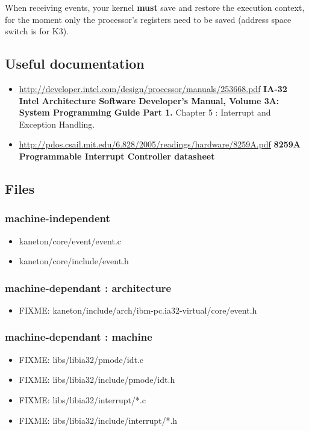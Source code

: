 When receiving events, your kernel \textbf{must} save and restore
the execution context, for the moment only the processor's
registers need to be saved (address space switch is for K3).

\subsection*{Useful documentation}

\begin{itemize}
  \item \url{http://developer.intel.com/design/processor/manuals/253668.pdf}
	    {\textbf{IA-32 Intel Architecture Software Developer's Manual,
	    Volume 3A: System Programming Guide Part 1.}}
	    Chapter 5 : Interrupt and Exception Handling.
  \item \url{http://pdos.csail.mit.edu/6.828/2005/readings/hardware/8259A.pdf}
	    {\textbf{8259A Programmable Interrupt Controller datasheet}}
\end{itemize}

\subsection*{Files}

\subsubsection{\color{filerefcolor} machine-independent}
\begin{itemize}
\item kaneton/core/event/event.c
\item kaneton/core/include/event.h
\end{itemize}

\subsubsection{\color{filerefcolor} machine-dependant : architecture}
\begin{itemize}
\item FIXME: kaneton/include/arch/ibm-pc.ia32-virtual/core/event.h
\end{itemize}

\subsubsection{\color{filerefcolor} machine-dependant : machine}
\begin{itemize}
\item FIXME: libs/libia32/pmode/idt.c
\item FIXME: libs/libia32/include/pmode/idt.h
\item FIXME: libs/libia32/interrupt/*.c
\item FIXME: libs/libia32/include/interrupt/*.h
\end{itemize}

